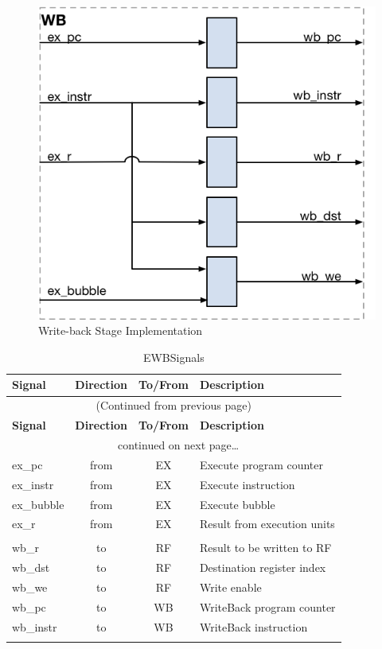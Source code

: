 \begin{figure}[h]
  \includegraphics{assets/img/Pipeline-WB.png}
  \caption{Write-back Stage Implementation}
\end{figure}

\begin{longtable}[]{@{}lccl@{}}
	\toprule
	\textbf{Signal} & \textbf{Direction} & \textbf{To/From} & \textbf{Description}\tabularnewline
	\midrule
	\endfirsthead
	\multicolumn{4}{c}{{(Continued from previous page)}} \\
	\toprule
	\textbf{Signal} & \textbf{Direction} & \textbf{To/From} & \textbf{Description}\tabularnewline
	\midrule
	\endhead
	\midrule \multicolumn{4}{c}{{\tablename\ \thetable{} continued on next page\ldots}} \\
	\endfoot
	\endlastfoot
	
		ex\_pc & from & EX & Execute program counter\\
		ex\_instr & from & EX & Execute instruction\\
		ex\_bubble & from & EX & Execute bubble\\
		ex\_r & from  & EX & Result from execution units\\
		 &  &  & \\
		wb\_r & to & RF & Result to be written to RF\\
		wb\_dst & to & RF & Destination register index\\
		wb\_we & to & RF & Write enable\\
		wb\_pc & to & WB & WriteBack program counter\\
		wb\_instr & to & WB & WriteBack instruction\\

	\bottomrule
	\caption{EWBSignals}
	\label{tab:wb-signals}
\end{longtable}


